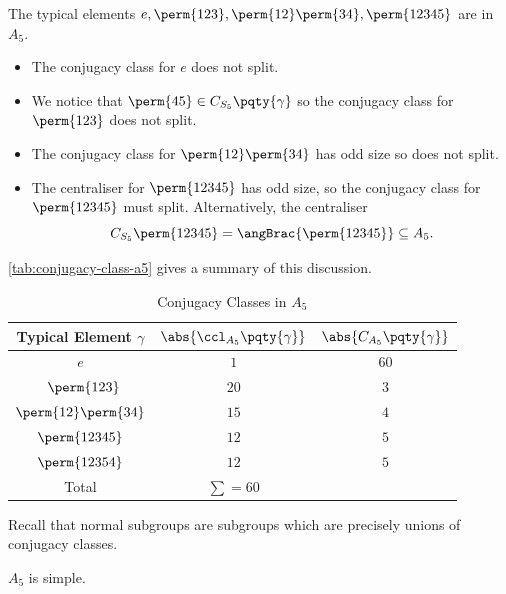 \begin{example*}
    The typical elements \(e, \perm{123}, \perm{12}\perm{34}, \perm{12345}\) are in \(A_5\).
    \begin{itemize}
        \item The conjugacy class for \(e\) does not split.
        \item We notice that \(\perm{45} \in C_{S_5} \pqty{\gamma}\) so the conjugacy class for \(\perm{123}\) does not split.
        \item The conjugacy class for \(\perm{12} \perm{34}\) has odd size so does not split.
        \item The centraliser for \(\perm{12345}\) has odd size, so the conjugacy class for \(\perm{12345}\) must split. Alternatively, the centraliser
        \[
            C_{S_5} \perm{12345} = \angBrac{\perm{12345}} \subseteq A_5.
        \]
    \end{itemize}

    \autoref{tab:conjugacy-class-a5} gives a summary of this discussion.
\end{example*}

\begin{table}[ht!]
    \centering
    \begin{tabular}{ccc}
        Typical Element \(\gamma\) & \(\abs{\ccl_{A_5} \pqty{\gamma}}\) & \(\abs{C_{A_5} \pqty{\gamma}}\)\\
        \hline\hline
        \(e\) & \(1\) & \(60\) \\\
        \(\perm{123}\) & \(20\) & \(3\) \\
        \(\perm{12} \perm{34}\) & \(15\) & \(4\) \\
        \(\perm{12345}\) & \(12\) & \(5\) \\
        \(\perm{12354}\) & \(12\) & \(5\) \\
        \hline
        Total & \(\sum = 60\) &
    \end{tabular}
    \caption{Conjugacy Classes in \(A_5\)}
    \label{tab:conjugacy-class-a5}
\end{table}

Recall that normal subgroups are subgroups which are precisely unions of conjugacy classes.

\begin{theorem}[\(A_5\) is Simple]
    \label{thm:a5-is-simple}%
    \(A_5\) is simple.
\end{theorem}

